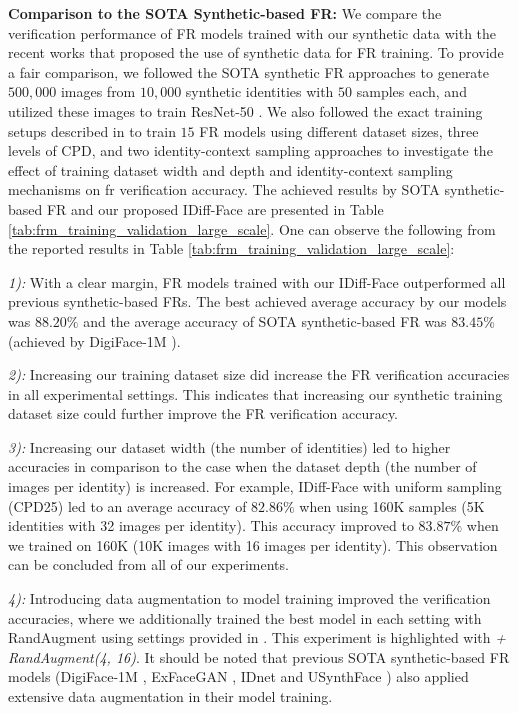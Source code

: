 \documentclass[10pt,twocolumn,letterpaper]{article}
\newcommand{\approachname}{IDiff-Face }
\begin{document}
\textbf{Comparison to the SOTA Synthetic-based FR:}
We compare the verification performance of FR models trained with our synthetic data with the recent works that proposed the use of synthetic data for FR training. To provide a fair comparison, we followed the SOTA synthetic FR approaches \cite{Qiu2021,Boutros2022SFace,FBoutros2022USynthFace} to generate $500{,}000$ images from $10{,}000$ synthetic identities with $50$ samples each, and utilized these images to train ResNet-50 \cite{ResNet}. We also followed the exact training setups described in \cite{FBoutros2022USynthFace} to train $15$ FR models using different dataset sizes, three levels of CPD, and two identity-context sampling approaches to investigate the effect of training dataset width and depth and identity-context sampling mechanisms on \acrshort{fr} verification accuracy. The achieved results by SOTA synthetic-based FR and our proposed \approachname are presented in Table \ref{tab:frm_training_validation_large_scale}. One can observe the following from the reported results in Table \ref{tab:frm_training_validation_large_scale}:


\textit{1):} With a clear margin, FR models trained with our \approachname outperformed all previous synthetic-based FRs. The best achieved average accuracy by our models was $88.20\%$ and the average accuracy of SOTA synthetic-based FR was $83.45\%$ (achieved by DigiFace-1M \cite{DigiFace1M}).


\textit{2):} Increasing our training dataset size did increase the FR verification accuracies in all experimental settings. This indicates that increasing our synthetic training dataset size could further improve the FR verification accuracy.


\textit{3):} Increasing our dataset width (the number of identities) led to higher accuracies in comparison to the case when the dataset depth (the number of images per identity) is increased. For example, \approachname with uniform sampling (CPD25) led to an average accuracy of $82.86\%$ when using 160K samples (5K identities with 32 images per identity). This accuracy improved to $83.87\%$ when we trained on 160K (10K images with 16 images per identity). This observation can be concluded from all of our experiments. 


\textit{4):} Introducing data augmentation \cite{FBoutros2022USynthFace} to model training improved the verification accuracies, where we additionally trained the best model in each setting with RandAugment \cite{RandAugment} using settings provided in \cite{FBoutros2022USynthFace}. This experiment is highlighted with \textit{+ RandAugment(4, 16)}. It should be noted that previous SOTA synthetic-based FR models (DigiFace-1M \cite{DigiFace1M}, ExFaceGAN \cite{ExFaceGAN}, IDnet \cite{IDnet} and USynthFace \cite{FBoutros2022USynthFace}) also applied extensive data augmentation in their model training.
\end{document}
